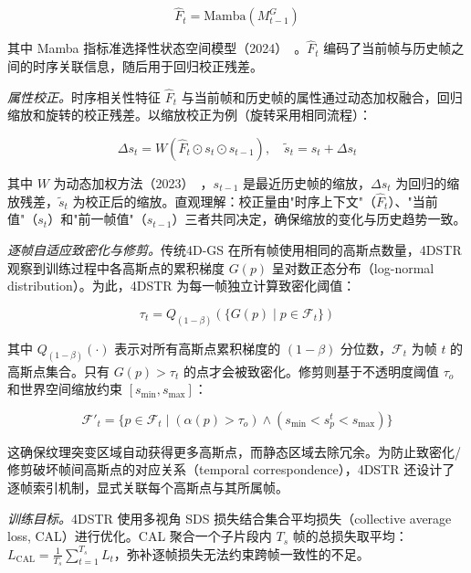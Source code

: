 \begin{equation}
\label{eq:4dstr_mamba}
\hat{F}_t = \mathrm{Mamba}(M^G_{t-1})
\end{equation}

其中 Mamba 指标准选择性状态空间模型（2024）~\cite{gu2023mamba}。$\hat{F}_t$ 编码了当前帧与历史帧之间的时序关联信息，随后用于回归校正残差。

\textit{属性校正。}时序相关性特征 $\hat{F}_t$ 与当前帧和历史帧的属性通过动态加权融合，回归缩放和旋转的校正残差。以缩放校正为例（旋转采用相同流程）：

\begin{equation}
\label{eq:4dstr_rectify_scale}
\Delta s_t = W(\hat{F}_t \odot s_t \odot s_{t-1}), \quad \tilde{s}_t = s_t + \Delta s_t
\end{equation}

其中 $W$ 为动态加权方法（2023）~\cite{aydemir2023adapt}，$s_{t-1}$ 是最近历史帧的缩放，$\Delta s_t$ 为回归的缩放残差，$\tilde{s}_t$ 为校正后的缩放。直观理解：校正量由"时序上下文"（$\hat{F}_t$）、"当前值"（$s_t$）和"前一帧值"（$s_{t-1}$）三者共同决定，确保缩放的变化与历史趋势一致。

\textit{逐帧自适应致密化与修剪。}传统4D-GS 在所有帧使用相同的高斯点数量，4DSTR 观察到训练过程中各高斯点的累积梯度 $G(p)$ 呈对数正态分布（log-normal distribution）。为此，4DSTR 为每一帧独立计算致密化阈值：

\begin{equation}
\label{eq:4dstr_densify}
\tau_t = Q_{(1-\beta)}\!\left(\{G(p) \mid p \in \mathcal{F}_t\}\right)
\end{equation}

其中 $Q_{(1-\beta)}(\cdot)$ 表示对所有高斯点累积梯度的 $(1-\beta)$ 分位数，$\mathcal{F}_t$ 为帧 $t$ 的高斯点集合。只有 $G(p) > \tau_t$ 的点才会被致密化。修剪则基于不透明度阈值 $\tau_o$ 和世界空间缩放约束 $[s_{\min}, s_{\max}]$：

\begin{equation}
\label{eq:4dstr_prune}
\mathcal{F}'_t = \{p \in \mathcal{F}_t \mid (\alpha(p) > \tau_o) \wedge (s_{\min} < s_p^t < s_{\max})\}
\end{equation}

这确保纹理突变区域自动获得更多高斯点，而静态区域去除冗余。为防止致密化/修剪破坏帧间高斯点的对应关系（temporal correspondence），4DSTR 还设计了逐帧索引机制，显式关联每个高斯点与其所属帧。

\textit{训练目标。}4DSTR 使用多视角 SDS 损失结合集合平均损失（collective average loss, CAL）进行优化。CAL 聚合一个子片段内 $T_s$ 帧的总损失取平均：$L_{\mathrm{CAL}} = \frac{1}{T_s} \sum_{t=1}^{T_s} L_t$，弥补逐帧损失无法约束跨帧一致性的不足。

